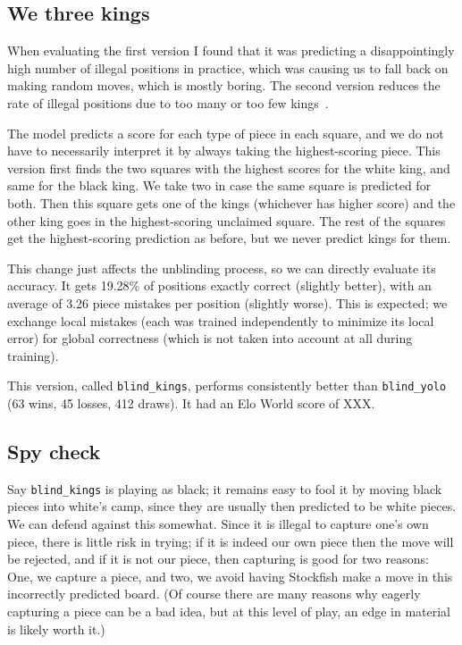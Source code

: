 \documentclass[twocolumn]{amsart}
\begin{document}
\subsection{We three kings} \label{sec:singleking}

When evaluating the first version I found that it was predicting a
disappointingly high number of illegal positions in practice, which
was causing us to fall back on making random moves, which is mostly
boring. The second version reduces the rate of illegal positions due
to too many or too few kings~\cite{kingme}.

The model predicts a score for each type of piece in each square, and
we do not have to necessarily interpret it by always taking the
highest-scoring piece. This version first finds the two squares with
the highest scores for the white king, and same for the black king. We
take two in case the same square is predicted for both. Then this
square gets one of the kings (whichever has higher score) and the
other king goes in the highest-scoring unclaimed square. The rest of
the squares get the highest-scoring prediction as before, but we never
predict kings for them.

This change just affects the unblinding process, so we can directly
evaluate its accuracy. It gets 19.28\% of positions exactly correct
(slightly better), with an average of 3.26 piece mistakes per position
(slightly worse). This is expected; we exchange local mistakes (each
was trained independently to minimize its local error) for global
correctness (which is not taken into account at all during training).

This version, called \verb+blind_kings+, performs consistently better
than \verb+blind_yolo+ (63 wins, 45 losses, 412 draws).
It had an Elo World score of XXX.

\subsection{Spy check} \label{sec:spycheck}

Say \verb+blind_kings+ is playing as black; it remains easy to fool it
by moving black pieces into white's camp, since they are usually then
predicted to be white pieces. We can defend against this somewhat.
Since it is illegal to capture one's own piece, there is little risk
in trying; if it is indeed our own piece then the move will be
rejected, and if it is not our piece, then capturing is good for two
reasons: One, we capture a piece, and two, we avoid having
Stockfish make a move in this incorrectly predicted board. (Of course
there are many reasons why eagerly capturing a piece can be a bad
idea, but at this level of play, an edge in material is likely worth
it.)
\end{document}

